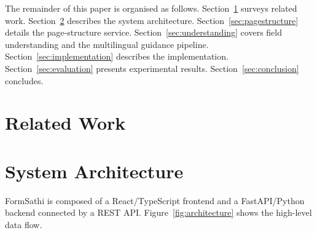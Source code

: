 \documentclass[conference]{IEEEtran}
\begin{document}
The remainder of this paper is organised as follows. Section~\ref{sec:related} surveys related work. Section~\ref{sec:system} describes the system architecture. Section~\ref{sec:pagestructure} details the page-structure service. Section~\ref{sec:understanding} covers field understanding and the multilingual guidance pipeline. Section~\ref{sec:implementation} describes the implementation. Section~\ref{sec:evaluation} presents experimental results. Section~\ref{sec:conclusion} concludes.

\section{Related Work}
\label{sec:related}


\section{System Architecture}
\label{sec:system}

FormSathi is composed of a React/TypeScript frontend and a FastAPI/Python backend connected by a REST API. Figure~\ref{fig:architecture} shows the high-level data flow.
\end{document}
